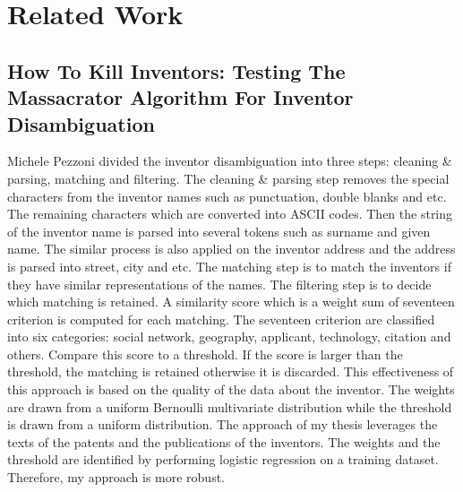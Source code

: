 \chapter{Related Work}
\label{cha:relwork}

\section{How To Kill Inventors: Testing The Massacrator Algorithm For Inventor Disambiguation}
Michele Pezzoni divided the inventor disambiguation into three steps: cleaning \& parsing, matching and filtering\cite{RePEc:grt:wpegrt:2012-29}. The cleaning \& parsing step removes the special characters from the inventor names such as punctuation, double blanks and etc. The remaining characters which are converted into ASCII codes. Then the string of the inventor name is parsed into several tokens such as surname and given name. The similar process is also applied on the inventor address and the address is parsed into street, city and etc. The matching step is to match the inventors if they have similar representations of the names. The filtering step is to decide which matching is retained. A similarity score which is a weight sum of  seventeen criterion is computed for each matching. The seventeen criterion are classified into six categories: social network, geography, applicant, technology, citation and others.  Compare this score to a threshold. If the score is larger than the threshold, the matching is retained otherwise it is discarded.  This effectiveness of this approach is based on the quality of the data about the inventor. The weights are drawn from a uniform Bernoulli multivariate distribution while the threshold is drawn from a uniform distribution. The approach of my thesis leverages the texts of the patents and the publications of the inventors. The weights and the threshold are identified by performing logistic regression on a training dataset. Therefore, my approach is more robust.
